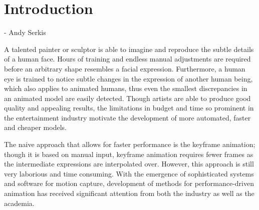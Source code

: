 \chapter{Introduction}
\label{ch:intro}
\begin{center}
 - Andy Serkis
\end{center}

A talented painter or sculptor is able to imagine and reproduce the subtle details of a human face. Hours of training and endless manual adjustments are required before an arbitrary shape resembles a facial expression. Furthermore, a human eye is trained to notice subtle changes in the expression of another human being, which also applies to animated humans, thus even the smallest discrepancies in an animated model are easily detected. Though artists are able to produce good quality and appealing results, the limitations in budget and time so prominent in the entertainment industry motivate the development of more automated, faster and cheaper models.

The naive approach that allows for faster performance is the keyframe animation; though it is based on manual input, keyframe animation requires fewer frames as the intermediate expressions are interpolated over. However, this approach is still very laborious and time consuming. With the emergence of sophisticated systems and software for motion capture, development of methods for performance-driven animation has received significant attention from both the industry as well as the academia.
